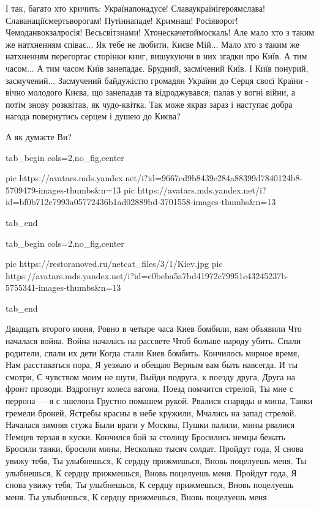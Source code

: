 І так, багато хто кричить: Українапонадусе! Славаукраїнігероямслава!
Славанаціїсмертьворогам! Путіннападе! Кримнаш! Росіяворог!  Чемоданвокзалросія!
Весьсвітзнами! Хтонескачетоймоскаль! Але мало хто з таким же натхненням
співає... Як тебе не любити, Києве Мій... Мало хто з таким же натхненням
перегортає сторінки книг, вишукуючи в них згадки про Київ.  А тим часом... А
тим часом Київ занепадає.  Брудний, засмічений Київ. І Київ понурий,
засмучений... Засмучений байдужістю громадян України до Серця своєї Країни -
вічно молодого Києва, що занепадав та відроджувався; палав у вогні війни, а
потім знову розквітав, як чудо-квітка.  Так може якраз зараз і наступає добра
нагода повернутись серцем і душею до Києва?

А як думаєте Ви?

\ifcmt
  tab_begin cols=2,no_fig,center

		 pic https://avatars.mds.yandex.net/i?id=9667cd9b8439e284a88399d7840124b8-5709479-images-thumbs&n=13
     pic https://avatars.mds.yandex.net/i?id=bf0b712e7993a05772436b1ad02889bd-3701558-images-thumbs&n=13

  tab_end
\fi


\ifcmt
  tab_begin cols=2,no_fig,center

     pic https://restoranoved.ru/netcat_files/3/1/Kiev.jpg
		 pic https://avatars.mds.yandex.net/i?id=e0beba5a7bd41972c79951e43245237b-5755341-images-thumbs&n=13

  tab_end
\fi

\raggedcolumns
\begin{multicols}{3} %
\em\color{blue}
\setlength{\parindent}{0pt}

\obeycr
Двадцать второго июня,
Ровно в четыре часа
Киев бомбили, нам объявили
Что началася война.
\smallskip
Война началась на рассвете
Чтоб больше народу убить.
Спали родители, спали их дети
Когда стали Киев бомбить.
\smallskip
Кончилось мирное время,
Нам расставаться пора,
Я уезжаю и обещаю
Верным вам быть навсегда.
\smallskip
И ты смотри,
С чувством моим не шути,
Выйди подруга, к поезду друга,
Друга на фронт проводи.
\smallskip
Вздрогнут колеса вагона,
Поезд помчится стрелой,
Ты мне с перрона — я с эшелона
Грустно помашем рукой.
\smallskip
Рвалися снаряды и мины,
Танки гремели броней,
Ястребы красны в небе кружили,
Мчались на запад стрелой.
\smallskip
Началася зимняя стужа
Были враги у Москвы,
Пушки палили, мины рвалися
Немцев терзая в куски.
\smallskip
Кончился бой за столицу
Бросились немцы бежать
Бросили танки, бросили мины,
Несколько тысяч солдат.
\smallskip
Пройдут года,
Я снова увижу тебя,
Ты улыбнешься,
К сердцу прижмешься,
Вновь поцелуешь меня.
Ты улыбнешься,
К сердцу прижмешься,
Вновь поцелуешь меня.
\smallskip
Пройдут года,
Я снова увижу тебя,
Ты улыбнешься,
К сердцу прижмешься,
Вновь поцелуешь меня.
Ты улыбнешься,
К сердцу прижмешься,
Вновь поцелуешь меня. 
\restorecr
\end{multicols} %

